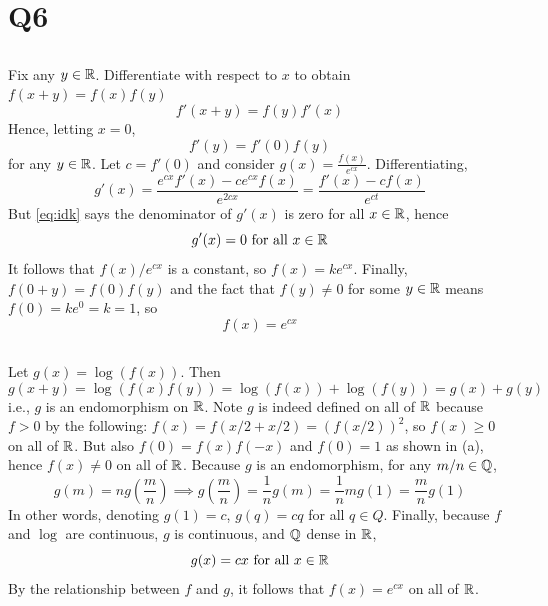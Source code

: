 \documentclass[12pt]{article}
\begin{document}
\section*{Q6} 
\subsection{} 
Fix any $y \in \mathbb{R}$. Differentiate with respect to $x$ to obtain $f(x + y) = f(x) f(y)$
$$f'(x + y) = f(y) f'(x)$$ 
Hence, letting $x = 0$, 
\begin{equation} \label{eq:idk}
  f'(y) = f'(0) f(y)
\end{equation}
for any $y \in \mathbb{R}$. 
Let $c = f'(0)$ and consider $g(x) = \frac{f(x)}{e^{cx}}$. 
Differentiating, 
$$g'(x) = \frac{e^{cx} f'(x) - ce^{cx} f(x)}{e^{2cx}} = \frac{f'(x) - cf(x)}{e^{ct}}$$ 
But \eqref{eq:idk} says the denominator of $g'(x)$ is zero for all $x \in \mathbb{R}$, hence 
$$g'(x) = 0 \text{ for all } x \in \mathbb{R}$$
It follows that $f(x) / e^{cx}$ is a constant, so $f(x) = k e^{cx}$.
Finally, $f(0 + y) = f(0)f(y)$ and the fact that $f(y) \neq 0$ for some $y \in \mathbb{R}$ means $f(0) = k e^0 = k = 1$, so 
$$f(x) = e^{cx}$$ 

\subsection{} 
Let $g(x) = \log(f(x))$. 
Then 
\begin{equation} \label{eq:hom} 
  g(x + y) = \log(f(x)f(y)) = \log(f(x)) + \log(f(y)) = g(x) + g(y)
\end{equation}
i.e., $g$ is an endomorphism on $\mathbb{R}$. 
Note $g$ is indeed defined on all of $\mathbb{R}$ because $f > 0$ by the following: 
$f(x) = f(x / 2 + x / 2) = (f(x / 2))^2$, so $f(x) \geq 0$ on all of $\mathbb{R}$. 
But also $f(0) = f(x) f(-x)$ and $f(0) = 1$ as shown in (a), hence $f(x) \neq 0$ on all of $\mathbb{R}$.  
Because $g$ is an endomorphism, for any $m / n \in \mathbb{Q}$, 
\begin{equation} \label{eq:cnt} 
  g(m) = n g(\frac{m}{n}) \implies g(\frac{m}{n}) = \frac{1}{n} g(m) = \frac{1}{n} m g(1) = \frac{m}{n} g(1)
\end{equation}
In other words, denoting $g(1) = c$, $g(q) = cq$ for all $q \in Q$. 
Finally, because $f$ and $\log$ are continuous, $g$ is continuous, and $\mathbb{Q}$ dense in $\mathbb{R}$, 
$$g(x) = cx \text{ for all } x \in \mathbb{R}$$ 
By the relationship between $f$ and $g$, it follows that $f(x) = e^{cx}$ on all of $\mathbb{R}$. 
\end{document}
